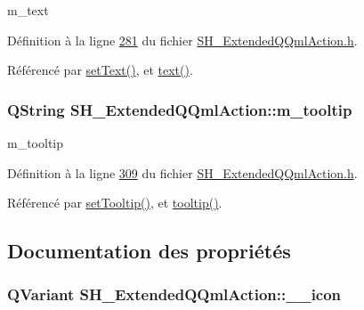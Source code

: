 m\-\_\-text 



Définition à la ligne \hyperlink{SH__ExtendedQQmlAction_8h_source_l00281}{281} du fichier \hyperlink{SH__ExtendedQQmlAction_8h_source}{S\-H\-\_\-\-Extended\-Q\-Qml\-Action.\-h}.



Référencé par \hyperlink{classSH__ExtendedQQmlAction_a2071b7b2ea7583a21553b28b4be814ef}{set\-Text()}, et \hyperlink{classSH__ExtendedQQmlAction_a827915b0ce23a1af60d9aaaf7d052447}{text()}.

\hypertarget{classSH__ExtendedQQmlAction_af04bb6a8446dcd4701a98fc667be693f}{
\subsubsection[{m\-\_\-tooltip}]{\setlength{\rightskip}{0pt plus 5cm}Q\-String S\-H\-\_\-\-Extended\-Q\-Qml\-Action\-::m\-\_\-tooltip\hspace{0.3cm}{\ttfamily [private]}}}\label{classSH__ExtendedQQmlAction_af04bb6a8446dcd4701a98fc667be693f}


m\-\_\-tooltip 



Définition à la ligne \hyperlink{SH__ExtendedQQmlAction_8h_source_l00309}{309} du fichier \hyperlink{SH__ExtendedQQmlAction_8h_source}{S\-H\-\_\-\-Extended\-Q\-Qml\-Action.\-h}.



Référencé par \hyperlink{classSH__ExtendedQQmlAction_a8c90255e9b7a957e82de4cae2226d3f8}{set\-Tooltip()}, et \hyperlink{classSH__ExtendedQQmlAction_ac703f5c565bd0c7a0892627885042f0c}{tooltip()}.



\subsection{Documentation des propriétés}
\hypertarget{classSH__ExtendedQQmlAction_ad8ec5e4334cc550e7358eb3dcf1596f0}{
\subsubsection[{\-\_\-\-\_\-icon}]{\setlength{\rightskip}{0pt plus 5cm}Q\-Variant S\-H\-\_\-\-Extended\-Q\-Qml\-Action\-::\-\_\-\-\_\-icon\hspace{0.3cm}{\ttfamily [read]}}}\label{classSH__ExtendedQQmlAction_ad8ec5e4334cc550e7358eb3dcf1596f0}


